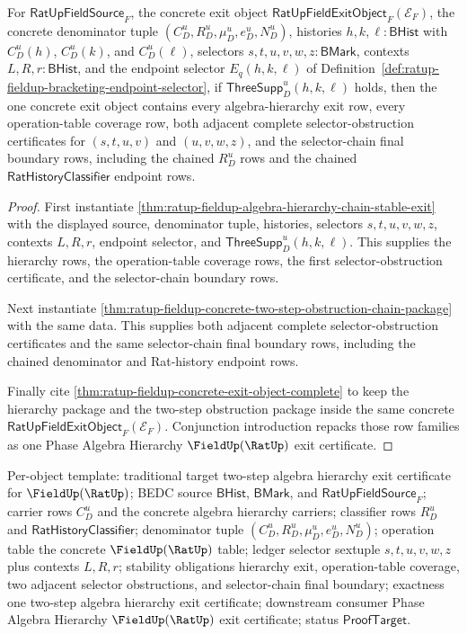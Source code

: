 \begin{theorem}
\label{thm:ratup-fieldup-two-step-algebra-hierarchy-exit-certificate}
For $\mathsf{RatUpFieldSource}_F$, the concrete exit object
$\mathsf{RatUpFieldExitObject}_F(\mathcal E_F)$, the concrete denominator tuple
$(C_D^u,R_D^u,\mu_D^u,e_D^u,N_D^u)$, histories
$h,k,\ell:\mathsf{BHist}$ with $C_D^u(h)$, $C_D^u(k)$, and $C_D^u(\ell)$,
selectors $s,t,u,v,w,z:\mathsf{BMark}$, contexts $L,R,r:\mathsf{BHist}$, and
the endpoint selector $E_q(h,k,\ell)$ of
Definition~\ref{def:ratup-fieldup-bracketing-endpoint-selector}, if
$\mathsf{ThreeSupp}_D^u(h,k,\ell)$ holds, then the one concrete exit object
contains every algebra-hierarchy exit row, every operation-table coverage row,
both adjacent complete selector-obstruction certificates for $(s,t,u,v)$ and
$(u,v,w,z)$, and the selector-chain final boundary rows, including the chained
$R_D^u$ rows and the chained $\mathsf{RatHistoryClassifier}$ endpoint rows.
\end{theorem}
\begin{proof}
First instantiate
\autoref{thm:ratup-fieldup-algebra-hierarchy-chain-stable-exit} with the
displayed source, denominator tuple, histories, selectors $s,t,u,v,w,z$,
contexts $L,R,r$, endpoint selector, and
$\mathsf{ThreeSupp}_D^u(h,k,\ell)$. This supplies the hierarchy rows, the
operation-table coverage rows, the first selector-obstruction certificate, and
the selector-chain boundary rows.

Next instantiate
\autoref{thm:ratup-fieldup-concrete-two-step-obstruction-chain-package} with
the same data. This supplies both adjacent complete selector-obstruction
certificates and the same selector-chain final boundary rows, including the
chained denominator and Rat-history endpoint rows.

Finally cite \autoref{thm:ratup-fieldup-concrete-exit-object-complete} to keep
the hierarchy package and the two-step obstruction package inside the same
concrete $\mathsf{RatUpFieldExitObject}_F(\mathcal E_F)$. Conjunction
introduction repacks those row families as one Phase Algebra Hierarchy
$\FieldUp(\RatUp)$ exit certificate.
\end{proof}

Per-object template: traditional target two-step algebra hierarchy exit
certificate for $\FieldUp(\RatUp)$; BEDC source $\mathsf{BHist}$,
$\mathsf{BMark}$, and $\mathsf{RatUpFieldSource}_F$; carrier rows $C_D^u$ and
the concrete algebra hierarchy carriers; classifier rows $R_D^u$ and
$\mathsf{RatHistoryClassifier}$; denominator tuple
$(C_D^u,R_D^u,\mu_D^u,e_D^u,N_D^u)$; operation table the concrete
$\FieldUp(\RatUp)$ table; ledger selector sextuple $s,t,u,v,w,z$ plus contexts
$L,R,r$; stability obligations hierarchy exit, operation-table coverage, two
adjacent selector obstructions, and selector-chain final boundary; exactness one
two-step algebra hierarchy exit certificate; downstream consumer Phase Algebra
Hierarchy $\FieldUp(\RatUp)$ exit certificate; status $\mathsf{ProofTarget}$.
